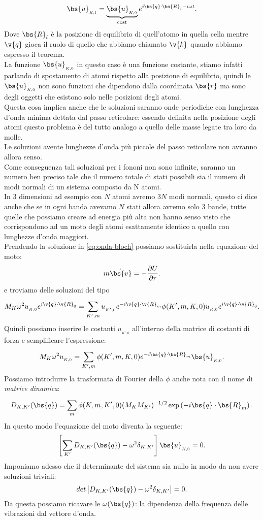 \[
	\bs{u}_{_{K,l}} = 
	\underbrace{
		\bs{u}_{_{K,0}} 
	}_{\text{cost}}
	e^{i\bs{q}\cdot\bs{R}_l -i\omega t}
	\label{eq:onda-bloch}
.\] 
Dove $\bs{R}_l$	è la posizione di equilibrio di quell'atomo in quella cella mentre $\v{q}$ gioca il ruolo di quello che abbiamo chiamato $\v{k}$ quando abbiamo espresso il teorema. \\
La funzione $\bs{u}_{_{K,0}}$ in questo caso è una funzione costante, stiamo infatti parlando di spostamento di atomi rispetto alla posizione di equilibrio, quindi le $\bs{u}_{_{K,0}}$ non sono funzioni che dipendono dalla coordinata $\bs{r}$ ma sono degli oggetti che esistono solo nelle posizioni degli atomi.\\
Questa cosa implica anche che le soluzioni saranno onde periodiche con lunghezza d'onda minima dettata dal passo reticolare: essendo definita nella posizione degli atomi questo problema è del tutto analogo a quello delle masse legate tra loro da molle. \\
Le soluzioni avente lunghezze d'onda più piccole del passo reticolare non avranno allora senso. \\
Come conseguenza tali soluzioni per i fononi non sono infinite, saranno un numero ben preciso tale che il numero totale di stati possibili sia il numero di modi normali di un sistema composto da N atomi.\\
In 3 dimensioni ad esempio con $N$ atomi avremo $3N$ modi normali, questo ci dice anche che se in ogni banda avevamo $N$ stati allora avremo solo 3 bande, tutte quelle che possiamo creare ad energia più alta non hanno senso visto che corrispondono ad un moto degli atomi esattamente identico a quello con lunghezze d'onda maggiori.\\
Prendendo la soluzione in \ref{eq:onda-bloch} possiamo sostituirla nella equazione del moto:
\[
	m\dot{\bs{v}} = -\frac{\partial U}{\partial r} 
.\] 
e troviamo delle soluzioni del tipo
\[\begin{aligned}
	M_{K} \omega ^2 u_{_{K,0}} e^{i\v{q}\cdot \v{R}_0}
	=
	\sum_{K',m}^{} u_{_{K',0}}e^{-i\v{q}\cdot \v{R}_m}\phi (K',m,K,0) u_{_{K,0}}e^{i\v{q}\cdot \v{R}_0}
.\end{aligned}\]
Quindi possiamo inserire le costanti $u_{_{K',0}}$ all'interno della matrice di costanti di forza e semplificare l'espressione:
\[
	M_{K} \omega ^2 u_{_{K,0}}
	=
	\sum_{K',m}^{} \phi(K',m,K,0) e^{-i \bs{q}\cdot\bs{R}_m} \bs{u}_{_{K,0}}
.\] 
Possiamo introdurre la trasformata di Fourier della $\phi$ anche nota con il nome di \textit{matrice dinamica}:
\[
	D_{K,K'}(\bs{q}) = 
	\sum_{m}^{} 
	\phi(K,m,K',0)(M_{K}M_{K'})^{-1/2}
	\exp\left( -i\bs{q}\cdot\bs{R}_m \right) 
.\] 
In questo modo l'equazione del moto diventa la seguente:
\[
	\left[ \sum_{K'}^{} D_{K,K'}(\bs{q}) - \omega ^2  \delta_{K,K'} \right]
	\bs{u}_{_{K,0}}=0
.\] 
Imponiamo adesso che il determinante del sistema sia nullo in modo da non avere soluzioni triviali:
\[
	det\left| D_{K,K'}(\bs{q}) -\omega ^2 \delta_{K,K'} \right| =0
.\] 
Da questa possiamo ricavare le $\omega (\bs{q})$: la dipendenza della frequenza delle vibrazioni dal vettore d'onda.
